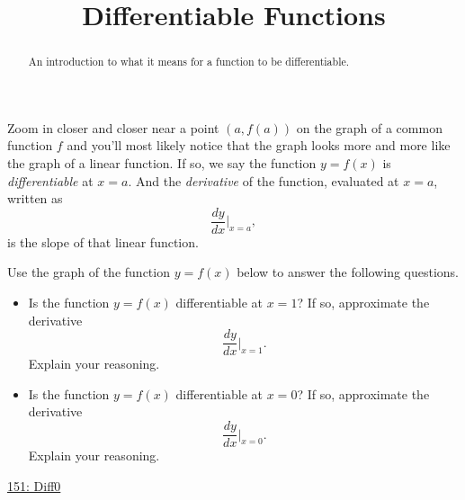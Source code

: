 \documentclass{ximera}
\title{Differentiable Functions}
\begin{document}
\begin{abstract}
An introduction to what it means for a function to be differentiable.
\end{abstract}
\maketitle

Zoom in closer and closer near a point $(a,f(a))$ on the graph of a common function $f$ and you'll most likely notice that the graph looks more and more like the graph of a linear function. If so, we say the function $y=f(x)$ is \emph{differentiable} at $x=a$. And the \emph{derivative} of the function, evaluated at $x=a$, written as
\[
     \frac{dy}{dx}\Big|_{x=a},
\]
is the slope of that linear function.

\begin{exploration}  \label{Exp:34gt4trt}
Use the graph of the function $y=f(x)$ below to answer the following questions.

\begin{itemize}
\item Is the function $y=f(x)$ differentiable at $x=1$? If so, approximate the derivative
\[
      \frac{dy}{dx}\Big|_{x=1}.
\]
Explain your reasoning.

\item Is the function $y=f(x)$ differentiable at $x=0$? If so, approximate the derivative
\[
      \frac{dy}{dx}\Big|_{x=0}.
\]
Explain your reasoning.
\end{itemize}
\begin{onlineOnly}
    \begin{center}
\end{center}
\end{onlineOnly}

\href{https://www.desmos.com/calculator/ojdj4r3r9v}{151: Diff0}

\end{exploration}
\end{document}
